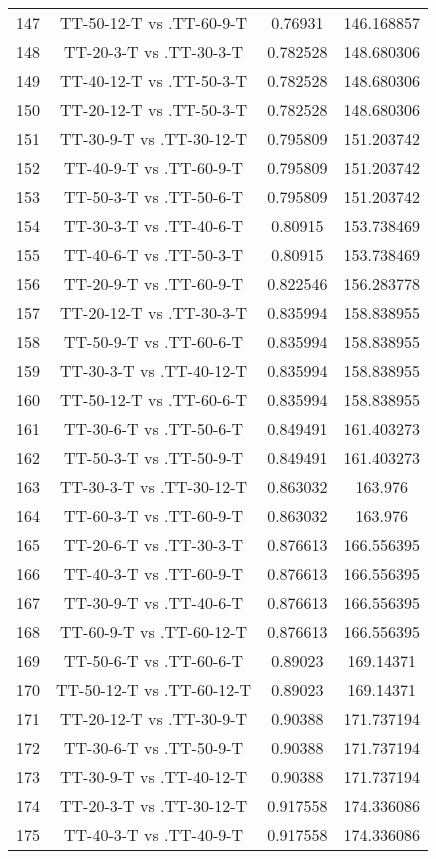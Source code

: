 \documentclass[a4paper,10pt]{article}
\begin{document}
\begin{landscape}
\begin{table}[!htp]
\begin{tabular}{cccc}
147&TT-50-12-T vs .TT-60-9-T&0.76931&146.168857\\
148&TT-20-3-T vs .TT-30-3-T&0.782528&148.680306\\
149&TT-40-12-T vs .TT-50-3-T&0.782528&148.680306\\
150&TT-20-12-T vs .TT-50-3-T&0.782528&148.680306\\
151&TT-30-9-T vs .TT-30-12-T&0.795809&151.203742\\
152&TT-40-9-T vs .TT-60-9-T&0.795809&151.203742\\
153&TT-50-3-T vs .TT-50-6-T&0.795809&151.203742\\
154&TT-30-3-T vs .TT-40-6-T&0.80915&153.738469\\
155&TT-40-6-T vs .TT-50-3-T&0.80915&153.738469\\
156&TT-20-9-T vs .TT-60-9-T&0.822546&156.283778\\
157&TT-20-12-T vs .TT-30-3-T&0.835994&158.838955\\
158&TT-50-9-T vs .TT-60-6-T&0.835994&158.838955\\
159&TT-30-3-T vs .TT-40-12-T&0.835994&158.838955\\
160&TT-50-12-T vs .TT-60-6-T&0.835994&158.838955\\
161&TT-30-6-T vs .TT-50-6-T&0.849491&161.403273\\
162&TT-50-3-T vs .TT-50-9-T&0.849491&161.403273\\
163&TT-30-3-T vs .TT-30-12-T&0.863032&163.976\\
164&TT-60-3-T vs .TT-60-9-T&0.863032&163.976\\
165&TT-20-6-T vs .TT-30-3-T&0.876613&166.556395\\
166&TT-40-3-T vs .TT-60-9-T&0.876613&166.556395\\
167&TT-30-9-T vs .TT-40-6-T&0.876613&166.556395\\
168&TT-60-9-T vs .TT-60-12-T&0.876613&166.556395\\
169&TT-50-6-T vs .TT-60-6-T&0.89023&169.14371\\
170&TT-50-12-T vs .TT-60-12-T&0.89023&169.14371\\
171&TT-20-12-T vs .TT-30-9-T&0.90388&171.737194\\
172&TT-30-6-T vs .TT-50-9-T&0.90388&171.737194\\
173&TT-30-9-T vs .TT-40-12-T&0.90388&171.737194\\
174&TT-20-3-T vs .TT-30-12-T&0.917558&174.336086\\
175&TT-40-3-T vs .TT-40-9-T&0.917558&174.336086\\

\end{tabular}
\end{table}
\end{landscape}
\end{document}
